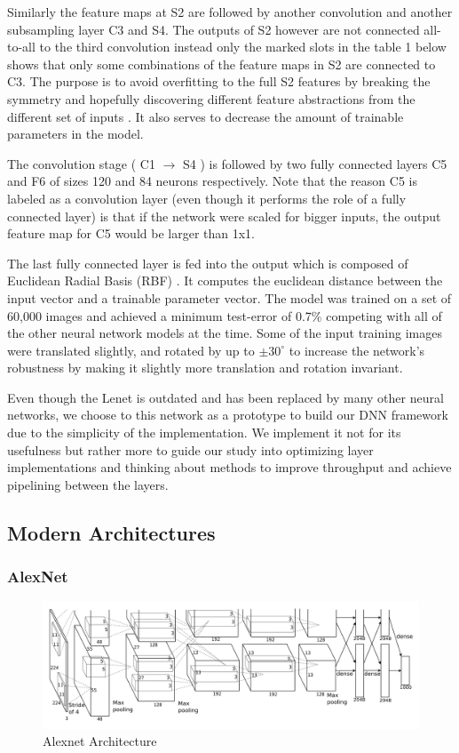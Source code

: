 Similarly the feature maps at S2 are followed by another convolution and another subsampling layer C3 and S4. The outputs of S2 however are not connected all-to-all to the third convolution instead only the marked slots in the table 1 below shows that only some combinations of the feature maps in S2 are connected to C3. The purpose is to avoid overfitting to the full S2 features by breaking the symmetry and hopefully discovering different feature abstractions from the different set of inputs \cite{lenet}. It also serves to decrease the amount of trainable parameters in the model. 

The convolution stage ( C1  $\rightarrow$ S4 ) is followed by two fully connected layers C5 and F6 of sizes 120 and 84 neurons respectively. Note that the reason C5 is labeled as a convolution layer (even though it performs the role of a fully connected layer) is that if the network were scaled for bigger inputs, the output feature map for C5 would be larger than 1x1. 

The last fully connected layer is fed into the output which is composed of Euclidean Radial Basis (RBF) \cite{chen1991orthogonal}. It computes the euclidean distance between the input vector and a trainable parameter vector. The model was trained on a set of 60,000 images and achieved a minimum test-error of 0.7\% competing with all of the other neural network models at the time. Some of the input training images were translated slightly, and rotated by up to $\pm{30^\circ}$ to increase the network’s robustness by making it slightly more translation and rotation invariant. 

Even though the Lenet is outdated and has been replaced by many other neural networks, we choose to this network as a prototype to build our DNN framework due to the simplicity of the implementation. We implement it not for its usefulness but rather more to guide our study into optimizing layer implementations and thinking about methods to improve throughput and achieve pipelining between the layers. 

\subsection{Modern Architectures} 

\subsubsection{AlexNet}

\begin{figure}[h!]
\centering
\includegraphics[width=1.0\textwidth]{Figures/alexnet}
\caption[AlexNet]{ Alexnet Architecture  \cite{alexnet}}
\label{fig:AlexNet Architecture}
\end{figure}

